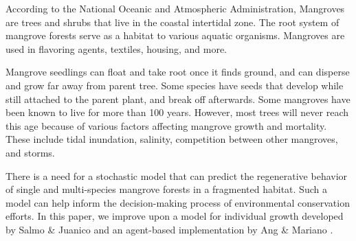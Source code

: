 According to the National Oceanic and Atmospheric Administration,
Mangroves are trees and shrubs that live in the coastal intertidal zone.
The root system of mangrove forests serve as a habitat to various
aquatic organisms. Mangroves are used in flavoring agents, textiles,
housing, and more.

Mangrove seedlings can float and take root once it finds ground, and can
disperse and grow far away from parent tree. Some species have seeds
that develop while still attached to the parent plant, and break off
afterwards. Some mangroves have been known to live for more than 100
years. However, most trees will never reach this age because of various
factors affecting mangrove growth and mortality. These include tidal
inundation, salinity, competition between other mangroves, and storms.

There is a need for a stochastic model that can predict the regenerative
behavior of single and multi-species mangrove forests in a fragmented
habitat. Such a model can help inform the decision-making process of environmental
conservation efforts. In this paper, we improve upon a model for individual growth
developed by Salmo \& Juanico \cite{SalmoJuanico2015} and an agent-based 
implementation by Ang \& Mariano \cite{mangrovesAngMariano}.